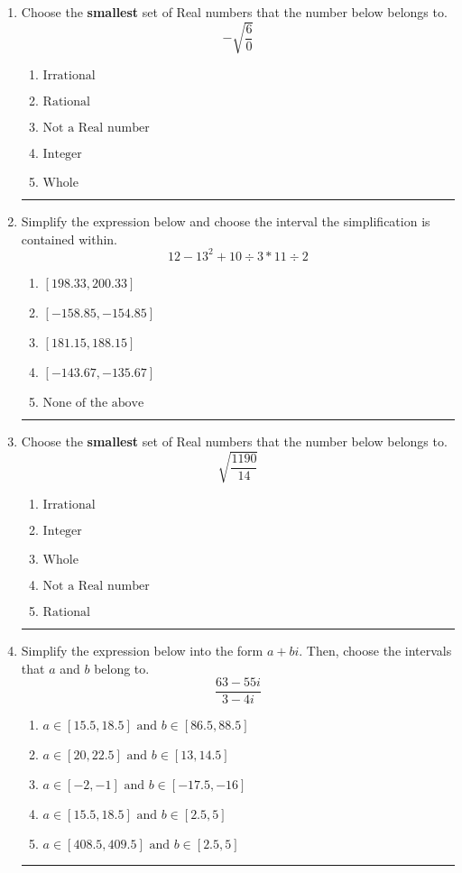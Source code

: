 \documentclass[14pt]{extbook}
\newcommand{\litem}[1]{\item#1\hspace*{-1cm}\rule{\textwidth}{0.4pt}}
\begin{document}
\begin{enumerate}
\litem{
Choose the \textbf{smallest} set of Real numbers that the number below belongs to.\[ -\sqrt{\frac{6}{0}} \]\begin{enumerate}[label=\Alph*.]
\item \( \text{Irrational} \)
\item \( \text{Rational} \)
\item \( \text{Not a Real number} \)
\item \( \text{Integer} \)
\item \( \text{Whole} \)

\end{enumerate} }
\litem{
Simplify the expression below and choose the interval the simplification is contained within.\[ 12 - 13^2 + 10 \div 3 * 11 \div 2 \]\begin{enumerate}[label=\Alph*.]
\item \( [198.33, 200.33] \)
\item \( [-158.85, -154.85] \)
\item \( [181.15, 188.15] \)
\item \( [-143.67, -135.67] \)
\item \( \text{None of the above} \)

\end{enumerate} }
\litem{
Choose the \textbf{smallest} set of Real numbers that the number below belongs to.\[ \sqrt{\frac{1190}{14}} \]\begin{enumerate}[label=\Alph*.]
\item \( \text{Irrational} \)
\item \( \text{Integer} \)
\item \( \text{Whole} \)
\item \( \text{Not a Real number} \)
\item \( \text{Rational} \)

\end{enumerate} }
\litem{
Simplify the expression below into the form $a+bi$. Then, choose the intervals that $a$ and $b$ belong to.\[ \frac{63 - 55 i}{3 - 4 i} \]\begin{enumerate}[label=\Alph*.]
\item \( a \in [15.5, 18.5] \text{ and } b \in [86.5, 88.5] \)
\item \( a \in [20, 22.5] \text{ and } b \in [13, 14.5] \)
\item \( a \in [-2, -1] \text{ and } b \in [-17.5, -16] \)
\item \( a \in [15.5, 18.5] \text{ and } b \in [2.5, 5] \)
\item \( a \in [408.5, 409.5] \text{ and } b \in [2.5, 5] \)


\end{enumerate}}
\end{enumerate}
\end{document}
